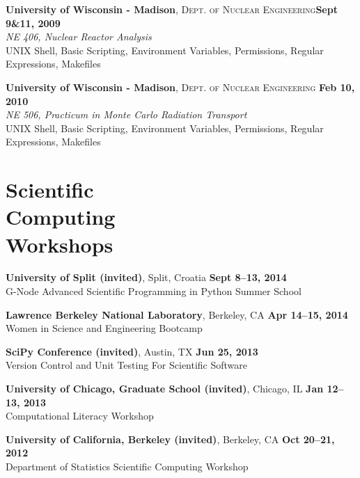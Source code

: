 \documentclass[margin,line]{resume}
\begin{document}
\begin{resume}
    \textbf{University of Wisconsin - Madison}, \textsc{Dept. of Nuclear Engineering}\hfill \textbf{Sept 9\&11, 2009}\\ 
               \textsl{NE 406, Nuclear Reactor Analysis}\\
               UNIX Shell, Basic Scripting, Environment Variables, Permissions, Regular Expressions, Makefiles 

    \textbf{University of Wisconsin - Madison}, \textsc{Dept. of Nuclear 
    Engineering} \hfill \textbf{Feb 10, 2010}\\ 
               \textsl{NE 506, Practicum in Monte Carlo Radiation Transport}\\
               UNIX Shell, Basic Scripting, Environment Variables, Permissions, Regular Expressions, Makefiles 

    \section{\mysidestyle Scientific\\Computing\\Workshops}
    \textbf{University of Split (invited)}, Split, Croatia \hfill \textbf{Sept 8--13, 2014}\\
    G-Node Advanced Scientific Programming in Python Summer School

    \textbf{Lawrence Berkeley National Laboratory}, Berkeley, CA \hfill \textbf{Apr 14--15, 2014}\\
    Women in Science and Engineering Bootcamp

    \textbf{SciPy Conference (invited)}, Austin, TX \hfill \textbf{Jun 25, 2013}\\
    Version Control and Unit Testing For Scientific Software

    \textbf{University of Chicago, Graduate School (invited)}, Chicago, IL \hfill \textbf{Jan 12--13, 2013}\\
    Computational Literacy Workshop

    \textbf{University of California, Berkeley (invited)}, Berkeley, CA \hfill \textbf{Oct 20--21, 2012}\\
    Department of Statistics Scientific Computing Workshop


\end{resume}
\end{document}
